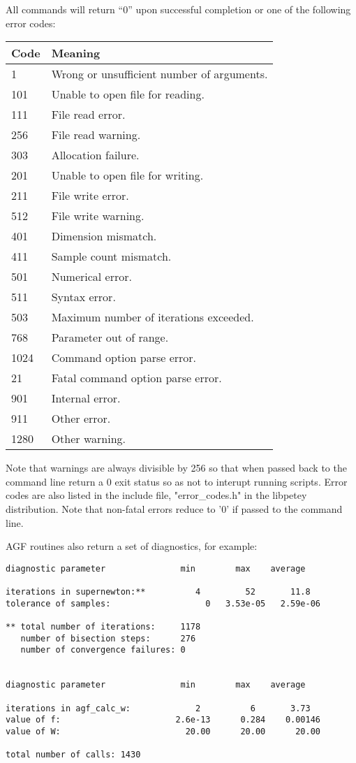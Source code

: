 \documentclass[12pt]{article}
\begin{document}
  All commands will return ``0'' upon successful completion or one of the following error codes:

\begin{tabular}{ll}
Code & Meaning\\
\hline
  1	&	Wrong or unsufficient number of arguments.\\
101	&	Unable to open file for reading.\\
111	&	File read error.\\
256	&	File read warning.\\
303	&	Allocation failure.\\
201	&	Unable to open file for writing.\\
211	&	File write error.\\
512	&	File write warning.\\
401	&	Dimension mismatch.\\
411	&	Sample count mismatch.\\
501	&	Numerical error.\\
511	&	Syntax error.\\
503	&	Maximum number of iterations exceeded.\\
768	&	Parameter out of range.\\
1024	&	Command option parse error.\\
 21	&	Fatal command option parse error.\\
901	&	Internal error.\\
911	&	Other error.\\
1280	&	Other warning.
\end{tabular}

Note that warnings are always divisible by 256 so that when passed back to the command line return a 0 exit status so as not to interupt running scripts.  Error codes are also listed in the include file, "error\_codes.h" in the libpetey distribution.  Note that non-fatal errors reduce to '0' if passed to the command line.

  AGF routines also return a set of diagnostics, for example:

\begin{verbatim}
diagnostic parameter               min        max    average

iterations in supernewton:**          4         52       11.8
tolerance of samples:                   0   3.53e-05   2.59e-06

** total number of iterations:     1178
   number of bisection steps:      276
   number of convergence failures: 0


diagnostic parameter               min        max    average

iterations in agf_calc_w:             2          6       3.73
value of f:                       2.6e-13      0.284    0.00146
value of W:                         20.00      20.00      20.00

total number of calls: 1430

\end{verbatim}
\end{document}
